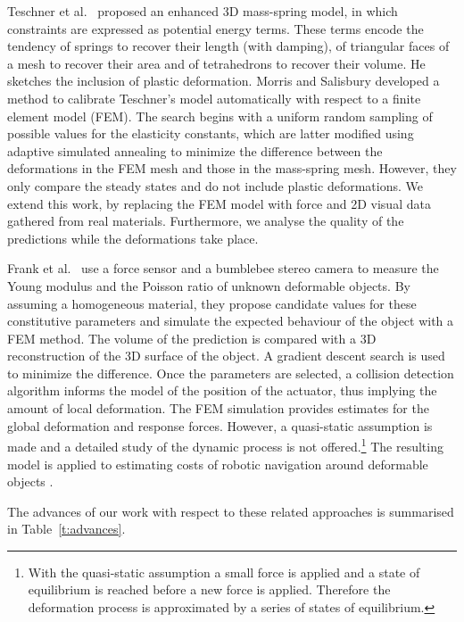 \documentclass[journal]{IEEEtran}
\newcommand{\tref}[1]{Table~\ref{#1}}
\newcounter{algorithm}
\newcommand{\comment}[1]{{\color{red} #1}}
\begin{document}
Teschner et al.\ \cite{Teschner2004} proposed an enhanced 3D mass-spring model, in which constraints are expressed as potential energy terms.  These terms encode the tendency of springs to recover their length (with damping), of triangular faces of a mesh to recover their area and of tetrahedrons to recover their volume.  He sketches the inclusion of plastic deformation.  Morris and Salisbury \cite{Morris2008} developed a method to calibrate Teschner's model automatically with respect to a \comment{finite element model (FEM)}.  The  search begins with a uniform random sampling of possible values for the elasticity constants, which are latter modified using adaptive simulated annealing to minimize the difference between the deformations in the FEM mesh and those in the mass-spring mesh.  However, they only compare the steady states and do not include plastic deformations.  We extend this work, by replacing the FEM model with force and 2D visual data gathered from real materials.  Furthermore, we analyse the quality of the predictions while the deformations take place.

Frank et al.\ \cite{Frank2010} use a force sensor and a bumblebee stereo camera to measure the Young modulus and the Poisson ratio of unknown deformable objects.  By assuming a homogeneous material, they propose candidate values for these constitutive parameters and simulate the expected behaviour of the object with a FEM method.  The volume of the prediction is compared with a 3D reconstruction of the 3D surface of the object.  A gradient descent search is used to minimize the difference.  Once the parameters are selected, a collision detection algorithm informs the model of the position of the actuator, thus implying the amount of local deformation.  The FEM simulation provides estimates for the global deformation and response forces.  However, a quasi-static assumption is made and a detailed study of the dynamic process is not offered.\footnote{With the quasi-static assumption a small force is applied and a state of equilibrium is reached before a new force is applied.  Therefore the deformation process is approximated 
by a series of states of equilibrium.}  The resulting model is applied to estimating costs of robotic navigation around deformable objects \cite{Frank2011}. 

The advances of our work with respect to these related approaches is summarised in \tref{t:advances}.
\end{document}
